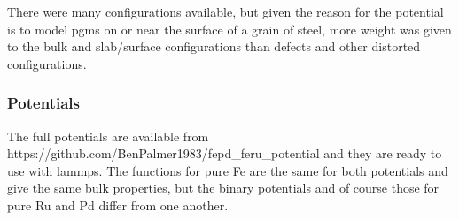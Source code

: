There were many configurations available, but given the reason for the potential is to model \acrshort{pgm}s on or near the surface of a grain of steel, more weight was given to the bulk and slab/surface configurations than defects and other distorted configurations.
 
\FloatBarrier
\subsubsection{Potentials}

The full potentials are available from https://github.com/BenPalmer1983/fepd\_feru\_potential and they are ready to use with \acrshort{lammps}.  The functions for pure \Gls{Fe} are the same for both potentials and give the same bulk properties, but the binary potentials and of course those for pure \Gls{Ru} and \Gls{Pd} differ from one another.  

